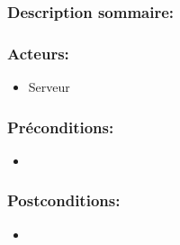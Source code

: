 \documentclass{scrreprt}
\begin{document}
\begin{itemizen}
\subsubsection{Description sommaire:} 
\subsubsection{Acteurs:}
\begin{itemize}
    \item Serveur
\end{itemize}
\subsubsection{Préconditions:}
\begin{itemize}
    \item  
\end{itemize} 
\subsubsection{Postconditions:}
\begin{itemize}
    \item  
\end{itemize} 

\end{itemizen}
\end{document}
